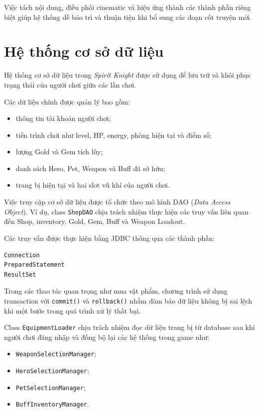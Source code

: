 \documentclass[12pt,a4paper]{report}
\begin{document}
    Việc tách nội dung, điều phối cinematic và hiệu ứng thành các
    thành phần riêng biệt giúp hệ thống dễ bảo trì và thuận tiện khi
    bổ sung các đoạn cốt truyện mới.


    \chapter{Hệ thống cơ sở dữ liệu}

    Hệ thống cơ sở dữ liệu trong \textit{Spirit Knight} được sử dụng để
    lưu trữ và khôi phục trạng thái của người chơi giữa các lần chơi.

    Các dữ liệu chính được quản lý bao gồm:

    \begin{itemize}
        \item thông tin tài khoản người chơi;
        \item tiến trình chơi như level, HP, energy, phòng hiện tại và điểm số;
        \item lượng Gold và Gem tích lũy;
        \item danh sách Hero, Pet, Weapon và Buff đã sở hữu;
        \item trang bị hiện tại và hai slot vũ khí của người chơi.
    \end{itemize}

    Việc truy cập cơ sở dữ liệu được tổ chức theo mô hình DAO
    (\textit{Data Access Object}). Ví dụ, class \texttt{ShopDAO}
    chịu trách nhiệm thực hiện các truy vấn liên quan đến Shop,
    inventory, Gold, Gem, Buff và Weapon Loadout.

    Các truy vấn được thực hiện bằng JDBC thông qua các thành phần:

    \begin{verbatim}
Connection
PreparedStatement
ResultSet
    \end{verbatim}

    Trong các thao tác quan trọng như mua vật phẩm, chương trình sử dụng
    transaction với \texttt{commit()} và \texttt{rollback()} nhằm đảm bảo
    dữ liệu không bị sai lệch khi một bước trong quá trình xử lý thất bại.

    Class \texttt{EquipmentLoader} chịu trách nhiệm đọc dữ liệu trang bị
    từ database sau khi người chơi đăng nhập và đồng bộ lại các hệ thống
    trong game như:

    \begin{itemize}
        \item \texttt{WeaponSelectionManager};
        \item \texttt{HeroSelectionManager};
        \item \texttt{PetSelectionManager};
        \item \texttt{BuffInventoryManager}.
    \end{itemize}
\end{document}
